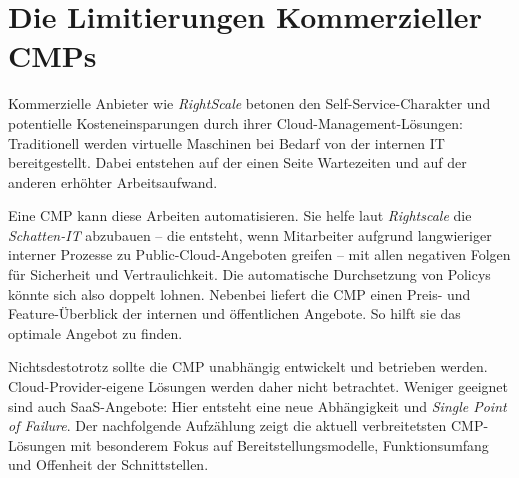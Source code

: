 \section{Die Limitierungen Kommerzieller CMPs}

Kommerzielle Anbieter wie \emph{RightScale} betonen den Self-Service-Charakter und potentielle Kosteneinsparungen durch ihrer Cloud-Management-Lösungen: Traditionell werden virtuelle Maschinen bei Bedarf von der internen IT bereitgestellt. Dabei entstehen auf der einen Seite Wartezeiten und auf der anderen erhöhter Arbeitsaufwand. 

Eine CMP kann diese Arbeiten automatisieren. Sie helfe laut \emph{Rightscale} die \emph{Schatten-IT} abzubauen -- die entsteht, wenn Mitarbeiter aufgrund langwieriger interner Prozesse zu Public-Cloud-Angeboten greifen -- mit allen negativen Folgen für Sicherheit und Vertraulichkeit. Die automatische Durchsetzung von Policys könnte sich also doppelt lohnen. Nebenbei liefert die CMP einen Preis- und Feature-Überblick der internen und öffentlichen Angebote. So hilft sie das optimale Angebot zu finden.

Nichtsdestotrotz sollte die CMP unabhängig entwickelt und betrieben werden. Cloud-Provider-eigene Lösungen werden daher nicht betrachtet. Weniger geeignet sind auch SaaS-Angebote: Hier entsteht eine neue Abhängigkeit und \emph{Single Point of Failure}. Der nachfolgende Aufzählung zeigt die aktuell verbreitetsten CMP-Lösungen mit besonderem Fokus auf Bereitstellungsmodelle, Funktionsumfang und Offenheit der Schnittstellen.



